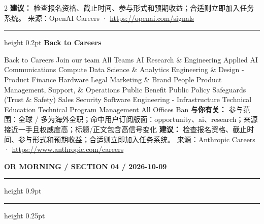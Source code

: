 \documentclass[10.5pt]{ctexart}
\begin{document}
\begin{multicols}{2}
\textbf{建议：} 检查报名资格、截止时间、参与形式和预期收益；合适则立即加入任务系统。
{\footnotesize\color{ormuted} 来源：OpenAI Careers · \url{https://openai.com/signals}}
\vspace{2mm}
\hrule height 0.2pt
\vspace{2mm}
{\large\bfseries Back to Careers}\par
Back to Careers Join our team All Teams AI Research \& Engineering Applied AI Communications Compute Data Science \& Analytics Engineering \& Design - Product Finance Hardware Legal Marketing \& Brand People Product Management, Support, \& Operations Public Benefit Public Policy Safeguards (Trust \& Safety) Sales Security Software Engineering - Infrastructure Technical Education Technical Program Management All Offices Ban
\textbf{与你有关：} 参与范围：全球 / 多为海外全职；命中用户订阅版面：opportunity、ai、research；来源接近一手且权威度高；标题/正文包含高信号变化
\textbf{建议：} 检查报名资格、截止时间、参与形式和预期收益；合适则立即加入任务系统。
{\footnotesize\color{ormuted} 来源：Anthropic Careers · \url{https://www.anthropic.com/careers}}
\end{multicols}
\newpage
{\small\bfseries OR MORNING / SECTION 04 / 2026-10-09}
\vspace{2mm}
\hrule height 0.9pt
\vspace{1.5mm}
\hrule height 0.25pt
\vspace{4mm}
\end{document}
